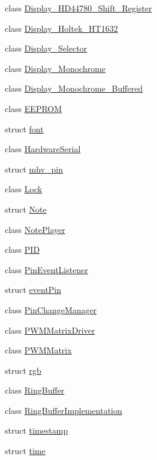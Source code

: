 \begin{DoxyCompactItemize}
class \hyperlink{classmhvlib_1_1_display___h_d44780___shift___register}{Display\-\_\-\-H\-D44780\-\_\-\-Shift\-\_\-\-Register}
\item 
class \hyperlink{classmhvlib_1_1_display___holtek___h_t1632}{Display\-\_\-\-Holtek\-\_\-\-H\-T1632}
\item 
class \hyperlink{classmhvlib_1_1_display___selector}{Display\-\_\-\-Selector}
\item 
class \hyperlink{classmhvlib_1_1_display___monochrome}{Display\-\_\-\-Monochrome}
\item 
class \hyperlink{classmhvlib_1_1_display___monochrome___buffered}{Display\-\_\-\-Monochrome\-\_\-\-Buffered}
\item 
class \hyperlink{classmhvlib_1_1_e_e_p_r_o_m}{E\-E\-P\-R\-O\-M}
\item 
struct \hyperlink{structmhvlib_1_1font}{font}
\item 
class \hyperlink{classmhvlib_1_1_hardware_serial}{Hardware\-Serial}
\item 
struct \hyperlink{structmhvlib_1_1mhv__pin}{mhv\-\_\-pin}
\item 
class \hyperlink{classmhvlib_1_1_lock}{Lock}
\item 
struct \hyperlink{structmhvlib_1_1_note}{Note}
\item 
class \hyperlink{classmhvlib_1_1_note_player}{Note\-Player}
\item 
class \hyperlink{classmhvlib_1_1_p_i_d}{P\-I\-D}
\item 
class \hyperlink{classmhvlib_1_1_pin_event_listener}{Pin\-Event\-Listener}
\item 
struct \hyperlink{structmhvlib_1_1event_pin}{event\-Pin}
\item 
class \hyperlink{classmhvlib_1_1_pin_change_manager}{Pin\-Change\-Manager}
\item 
class \hyperlink{classmhvlib_1_1_p_w_m_matrix_driver}{P\-W\-M\-Matrix\-Driver}
\item 
class \hyperlink{classmhvlib_1_1_p_w_m_matrix}{P\-W\-M\-Matrix}
\item 
struct \hyperlink{structmhvlib_1_1rgb}{rgb}
\item 
class \hyperlink{classmhvlib_1_1_ring_buffer}{Ring\-Buffer}
\item 
class \hyperlink{classmhvlib_1_1_ring_buffer_implementation}{Ring\-Buffer\-Implementation}
\item 
struct \hyperlink{structmhvlib_1_1timestamp}{timestamp}
\item 
struct \hyperlink{structmhvlib_1_1time}{time}

\end{DoxyCompactItemize}
